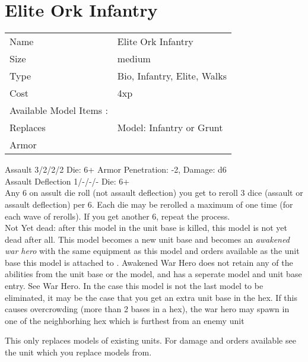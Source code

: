 






\pagebreak

\section{ Elite Ork Infantry }

\begin{tabular}{ll}
  Name & Elite Ork Infantry \\
  Size & medium\\
  Type & Bio, Infantry, Elite, Walks\\
  Cost & 4xp\\
  Available Model Items : &\\
  Replaces & Model: Infantry or Grunt\\
  Armor & 
\end{tabular}



Assault 3/2/2/2 Die: 6+ Armor Penetration: -2, Damage: d6 \\
Assault Deflection 1/-/-/- Die: 6+\\
Any 6 on assult die roll (not assault deflection) you get to reroll 3 dice (assault or assault deflection) per 6. Each die may be rerolled a maximum of one time (for each wave of rerolls). If you get another 6, repeat the process.
\ \\

Not Yet dead: after this model in the unit base is killed, this model is not yet dead after all. This model becomes a new unit base and becomes an {\it awakened war hero} with the same equipment as this model and orders available as the unit base this model is attached to . Awakened War Hero does not retain any of the abilities from the unit base or the model, and has a seperate model and unit base entry. See War Hero. In the case this model is not the last model to be eliminated, it may be the case that you get an extra unit base in the hex. If this causes overcrowding (more than 2 bases in a hex), the war hero may spawn in one of the neighborhing hex which is furthest from an enemy unit



This only replaces models of existing units. For damage and orders available see the unit which you replace models from.



\pagebreak

